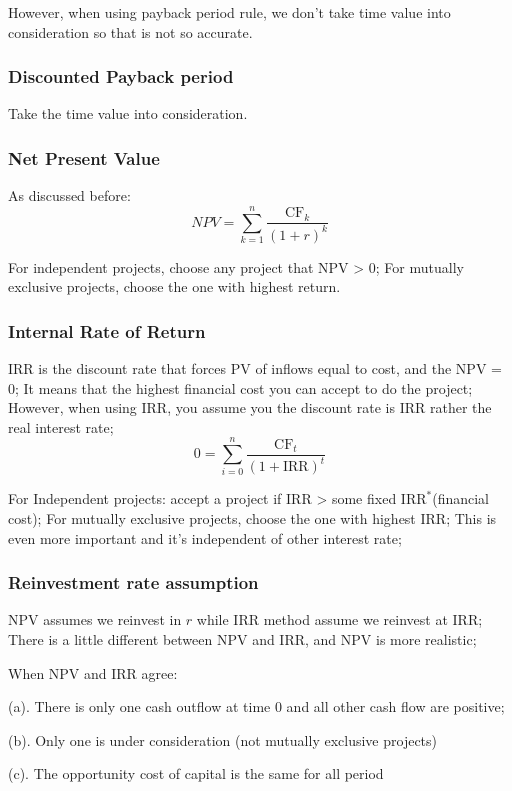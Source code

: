 \documentclass[10pt, a4paper]{article}
\begin{document}
                However, when using payback period rule, we don't take time value into consideration so that is not so accurate. 
            \subsubsection{Discounted Payback period}
                Take the time value into consideration. 
            \subsubsection{Net Present Value}
                As discussed before:
                $$NPV = \sum_{k = 1}^{n}\frac{\text{CF}_k}{(1 + r)^k}$$

                For independent projects, choose any project that NPV > 0; For mutually exclusive projects, choose the one with highest return. 
            \subsubsection{Internal Rate of Return}
                IRR is the discount rate that forces PV of inflows equal to cost, and the NPV = 0; It means that the highest financial cost you can accept to do the project; However, when using IRR, you assume you the discount rate is IRR rather the real interest rate; 
                $$0 = \sum_{i = 0}^{n}\frac{\text{CF}_t}{(1 + \text{IRR})^t}$$

                For Independent projects: accept a project if IRR > some fixed $\text{IRR}^*$(financial cost); For mutually exclusive projects, choose the one with highest IRR; This is even more important and it's independent of other interest rate; 
            \subsubsection{Reinvestment rate assumption}
                NPV assumes we reinvest in $r$  while IRR method assume we reinvest at IRR; There is a little different between NPV and IRR, and NPV is more realistic;

                When NPV and IRR agree: 
                
                \quad(a). There is only one cash outflow at time 0 and all other cash flow are positive; 

                \quad(b). Only one is under consideration (not mutually exclusive projects) 

                \quad(c). The opportunity cost of capital is the same for all period 
\end{document}

